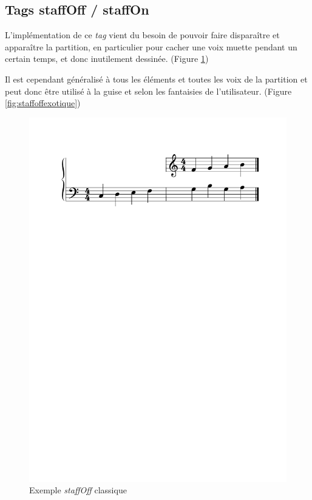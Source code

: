 \documentclass{article}
\newenvironment{gmncode}	{\vspace{-2mm}\small\verbatim}{\endverbatim\vspace{-2mm}}
\begin{document}
\subsection{Tags staffOff / staffOn}\label{subsec:staffoff}

\begin{gmncode}
[ ... \staffOff ... \staffOn ... ]
\end{gmncode}



L'implémentation de ce \emph{tag} vient du besoin de pouvoir faire disparaître et apparaître la partition, en particulier pour cacher une voix muette pendant un certain temps, et donc inutilement dessinée. (Figure \ref{fig:staffoffsimple}) 

Il est cependant généralisé à tous les éléments et toutes les voix de la partition et peut donc être utilisé à la guise et selon les fantaisies de l'utilisateur. (Figure \ref{fig:staffoffexotique})

\begin{figure}[h]
\centering
\includegraphics[width=\columnwidth]{img/staffoff.pdf}
\caption{ Exemple \emph{staffOff} classique}
\label{fig:staffoffsimple}
\end{figure}
\end{document}
